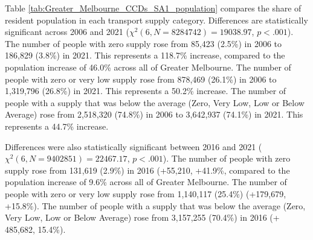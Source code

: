 \documentclass[preprint, 3p,
authoryear]{elsarticle} %
\begin{document}
Table \ref{tab:Greater_Melbourne_CCDs_SA1_population} compares the share
of resident population in each transport supply category. Differences
are statistically significant across 2006 and 2021
(\(\chi^2(6, N = 8284742) = 19038.97\), \(p < .001\)). The number of
people with zero supply rose from 85,423 (2.5\%) in 2006 to 186,829
(3.8\%) in 2021. This represents a 118.7\% increase, compared to the
population increase of 46.0\% across all of Greater Melbourne. The
number of people with zero or very low supply rose from 878,469 (26.1\%)
in 2006 to 1,319,796 (26.8\%) in 2021. This represents a 50.2\%
increase. The number of people with a supply that was below the average
(Zero, Very Low, Low or Below Average) rose from 2,518,320 (74.8\%) in
2006 to 3,642,937 (74.1\%) in 2021. This represents a 44.7\% increase.

Differences were also statistically significant between 2016 and 2021
(\(\chi^2(6, N = 9402851) = 22467.17\), \(p < .001\)). The number of
people with zero supply rose from 131,619 (2.9\%) in 2016 (+55,210,
+41.9\%, compared to the population increase of 9.6\% across all of
Greater Melbourne. The number of people with zero or very low supply
rose from 1,140,117 (25.4\%) (+179,679, +15.8\%). The number of people
with a supply that was below the average (Zero, Very Low, Low or Below
Average) rose from 3,157,255 (70.4\%) in 2016 (+ 485,682, 15.4\%).
\end{document}
